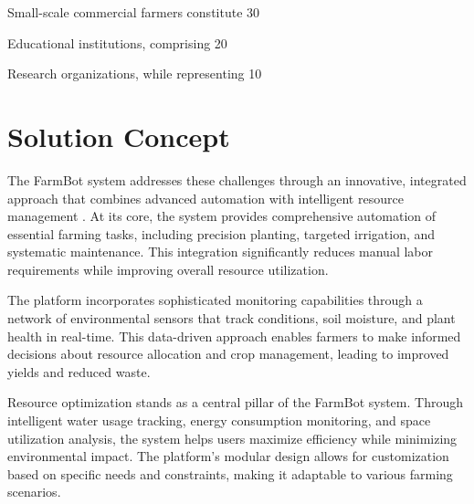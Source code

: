 Small-scale commercial farmers constitute 30%

Educational institutions, comprising 20%

Research organizations, while representing 10%

\section{Solution Concept}
The FarmBot system addresses these challenges through an innovative, integrated approach that combines advanced automation with intelligent resource management \cite{automation2023}. At its core, the system provides comprehensive automation of essential farming tasks, including precision planting, targeted irrigation, and systematic maintenance. This integration significantly reduces manual labor requirements while improving overall resource utilization.

The platform incorporates sophisticated monitoring capabilities through a network of environmental sensors that track conditions, soil moisture, and plant health in real-time. This data-driven approach enables farmers to make informed decisions about resource allocation and crop management, leading to improved yields and reduced waste.

Resource optimization stands as a central pillar of the FarmBot system. Through intelligent water usage tracking, energy consumption monitoring, and space utilization analysis, the system helps users maximize efficiency while minimizing environmental impact. The platform's modular design allows for customization based on specific needs and constraints, making it adaptable to various farming scenarios.

